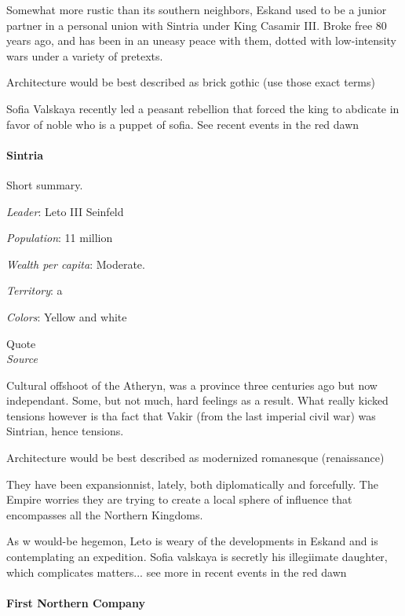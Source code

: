 Somewhat more rustic than its southern neighbors, Eskand used to be a junior partner in a personal union with Sintria under King Casamir III. Broke free 80 years ago, and has been in an uneasy peace with them, dotted with low-intensity wars under a variety of pretexts.
    

Architecture would be best described as brick gothic (use those exact terms)



Sofia Valskaya recently led a peasant rebellion that forced the king to abdicate in favor of noble who is a puppet of sofia. See recent events in the red dawn



\paragraph{Sintria}

Short summary.

\textit{Leader}: Leto III Seinfeld

\textit{Population}: 11 million

\textit{Wealth per capita}: Moderate.

\textit{Territory}: a
    
\textit{Colors}: Yellow and white


\begin{rpg-quotebox}
    Quote \\ \textendash \textit{Source}
    \end{rpg-quotebox}


Cultural offshoot of the Atheryn, was a province three centuries ago but now independant. Some, but not much, hard feelings as a result. What really kicked tensions however is tha fact that Vakir (from the last imperial civil war) was Sintrian, hence tensions.

Architecture would be best described as modernized romanesque (renaissance)

They have been expansionnist, lately, both diplomatically and forcefully. The Empire worries they are trying to create a local sphere of influence that encompasses all the Northern Kingdoms.

As w would-be hegemon, Leto is weary of the developments in Eskand and is contemplating an expedition.
Sofia valskaya is secretly his illegiimate daughter, which complicates matters... see more in recent events in the red dawn



\paragraph{First Northern Company}


